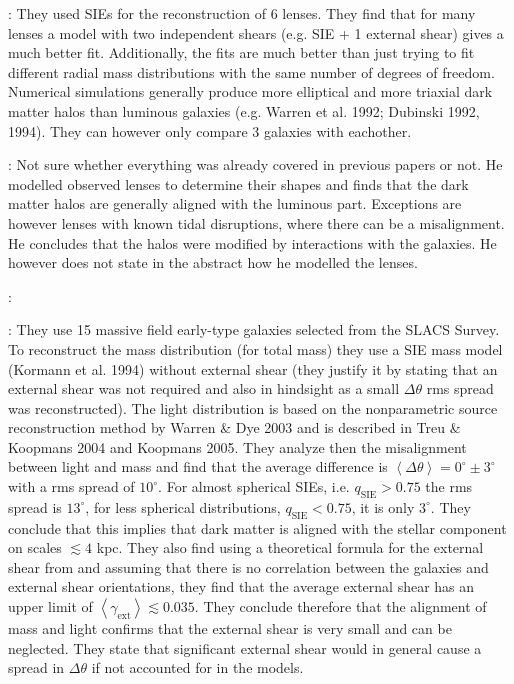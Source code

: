 \documentclass[10pt]{article}
\begin{document}
\textbf{\cite{1998ApJ...509..561K}}: They used SIEs for the reconstruction of 6 lenses. They find that for many lenses a model with two independent shears (e.g. SIE + 1 external shear) gives a much better fit. Additionally, the fits are much better than just trying to fit different radial mass distributions with the same number of degrees of freedom. Numerical simulations generally produce more elliptical and more triaxial dark matter halos than luminous galaxies (e.g. Warren et al. 1992; Dubinski 1992, 1994). They can however only compare 3 galaxies with eachother.

\textbf{\cite{1998PhDT.........6K}}: Not sure whether everything was already covered in previous papers or not. He modelled observed lenses to determine their shapes and finds that the dark matter halos are generally aligned with the luminous part. Exceptions are however lenses with known tidal disruptions, where there can be a misalignment. He concludes that the halos were modified by interactions with the galaxies. He however does not state in the abstract how he modelled the lenses.

\textbf{\cite{2011AstRv...6f..43B}}:

\textbf{\cite{2006ApJ...649..599K}}: They use 15 massive field early-type galaxies selected from the SLACS Survey. To reconstruct the mass distribution (for total mass) they use a SIE mass model (Kormann et al. 1994) without external shear (they justify it by stating that an external shear was not required and also in hindsight as a small $\Delta\theta$ rms spread was reconstructed). The light distribution is based on the nonparametric source reconstruction method by Warren & Dye 2003 and is described in Treu & Koopmans 2004 and Koopmans 2005. They analyze then the misalignment between light and mass and find that the average difference is $\left<\Delta\theta\right>=0^{\circ}\pm3^{\circ}$ with a rms spread of $10^{\circ}$. For almost spherical SIEs, i.e. $q_{\mathrm{SIE}}>0.75$ the rms spread is $13^{\circ}$, for less spherical distributions, $q_{\mathrm{SIE}}<0.75$, it is only $3^{\circ}$. They conclude that this implies that dark matter is aligned with the stellar component on scales $\lesssim4$ kpc. They also find using a theoretical formula for the external shear from \cite{1997ApJ...482..604K} and assuming that there is no correlation between the galaxies and external shear orientations, they find that the average external shear has an upper limit of $\left<\gamma_{\mathrm{ext}}\right>\lesssim0.035$. They conclude therefore that the alignment of mass and light confirms that the external shear is very small and can be neglected. They state that significant external shear would in general cause a spread in $\Delta\theta$ if not accounted for in the models.
\end{document}
